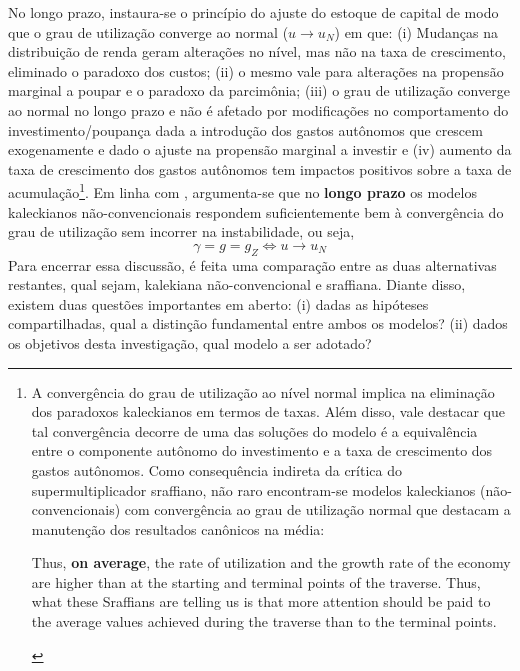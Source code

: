 No longo prazo, instaura-se o princípio do ajuste do estoque de capital de modo que o grau de utilização converge ao normal ($u \to u_N$) em que: (i) Mudanças na distribuição de renda geram alterações no nível, mas não na taxa de crescimento, eliminado o paradoxo dos custos; (ii) o mesmo vale para alterações na propensão marginal a poupar e o paradoxo da parcimônia; (iii) o grau de utilização converge ao normal no longo prazo e não é afetado por modificações no comportamento do investimento/poupança dada a introdução dos gastos autônomos que crescem exogenamente e dado o ajuste na propensão marginal a investir e (iv) aumento da taxa de crescimento dos gastos autônomos tem impactos positivos sobre a taxa de acumulação\footnote{
	A convergência do grau de utilização ao nível normal implica na eliminação dos paradoxos kaleckianos em termos de taxas. Além disso, vale destacar que tal convergência decorre de uma das soluções do modelo é a equivalência entre o componente autônomo do investimento e a taxa de crescimento dos gastos autônomos. Como consequência indireta da crítica do supermultiplicador sraffiano, não raro encontram-se modelos kaleckianos (não-convencionais) com convergência ao grau de utilização normal que destacam a manutenção dos resultados canônicos na média:
	
	\begin{citacao}
		Thus, \textbf{on average}, the rate of utilization and the growth rate of the
		economy are higher than at the starting and terminal points of the traverse. Thus, what
		these Sraffians are telling us is that more attention should be paid to the average values
		achieved during the traverse than to the terminal points.
		\cite[p.~408, grifos adicionados]{lavoie_post-keynesian_2015}
	\end{citacao}
	
}. Em linha com \textcite{fagundes_role_2017}, argumenta-se que no \textbf{longo prazo} os modelos kaleckianos não-convencionais respondem suficientemente bem à convergência do grau de utilização sem incorrer na instabilidade, ou seja,
$$
\gamma = g = g_Z \Leftrightarrow u \to u_N
$$
Para encerrar essa discussão, é feita uma comparação entre as duas alternativas restantes, qual sejam, kalekiana não-convencional e sraffiana.  Diante disso, existem duas questões importantes em aberto: (i) dadas as hipóteses compartilhadas, qual a distinção fundamental entre ambos os modelos? (ii) dados os objetivos desta investigação, qual modelo a ser adotado? 

